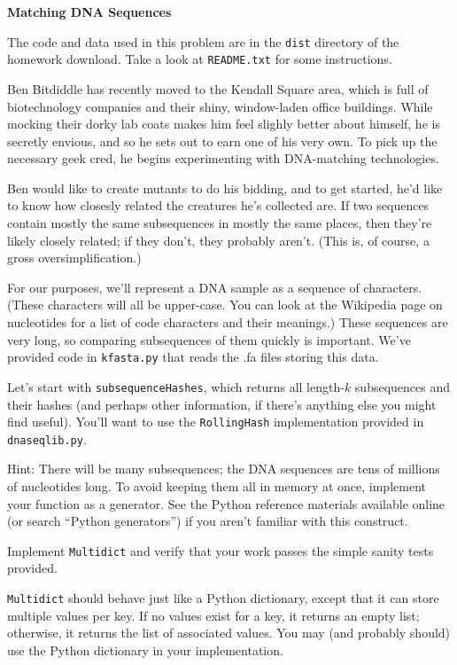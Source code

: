 \documentclass[12pt,twoside]{article}
\begin{document}
\begin{problems}
\begin{problemparts}
\end{problemparts}

\problem {} \textbf{Matching DNA Sequences}

The code and data used in this problem are in the \texttt{dist} directory of the
homework download. Take a look at \texttt{README.txt} for some instructions.

Ben Bitdiddle has recently moved to the Kendall Square area, which is full of
biotechnology companies and their shiny, window-laden office buildings. While mocking
their dorky lab coats makes him feel slighly better about himself, he is secretly
envious, and so he sets out to earn one of his very own. To pick up the necessary
geek cred, he begins experimenting with DNA-matching technologies.

Ben would like to create mutants to do his bidding, and to get started, he'd like to
know how closesly related the creatures he's collected are. If two sequences contain
mostly the same subsequences in mostly the same places, then they're likely closely
related; if they don't, they probably aren't. (This is, of course, a gross
oversimplification.)

For our purposes, we'll represent a DNA sample as a sequence of characters. (These
characters will all be upper-case. You can look at the Wikipedia page on nucleotides
for a list of code characters and their meanings.) These sequences are very long, so
comparing subsequences of them quickly is important. We've provided code in
\texttt{kfasta.py} that reads the .fa files storing this data.

\begin{problemparts}

\problempart Let's start with \texttt{subsequenceHashes}, which returns all
length-$k$ subsequences and their hashes (and perhaps other information, if there's
anything else you might find useful). You'll want to use the \texttt{RollingHash}
implementation provided in \texttt{dnaseqlib.py}.

	Hint: There will be many subsequences;
	the DNA sequences are tens of millions of nucleotides long. To avoid keeping them
	all in memory at once, implement your function as a generator. See the Python
	reference materials available online (or search ``Python generators'') if you
	aren't familiar with this construct.

\problempart Implement \texttt{Multidict} and verify that your work passes the simple
sanity tests provided.

	\texttt{Multidict} should behave just like a Python dictionary, except that it can
	store multiple values per key. If no values exist for a key, it returns an empty
	list; otherwise, it returns the list of associated values. You may (and probably
	should) use the Python dictionary in your implementation.


\end{problemparts}
\end{problems}
\end{document}
